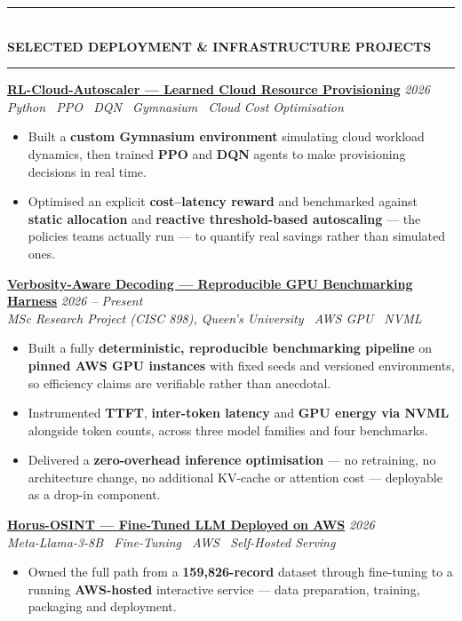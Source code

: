 \documentclass[10pt, a4paper]{article}
\newcommand{\cvsection}[1]{%
  \vspace{3pt}%
  {\color{navy}\rule{\linewidth}{1.1pt}}\\[0.5pt]%
  {\color{navy}\bfseries\fontsize{9.5}{11}\selectfont\uppercase{#1}}\\[-4pt]%
  {\color{teal}\rule{\linewidth}{0.6pt}}%
  \vspace{2pt}%
}
\newcommand{\cvproject}[3]{%
  \vspace{2.5pt}%
  {\bfseries\color{navy}#1} \hfill {\color{midgray}\textit{#3}}\\[-1.5pt]%
  {\color{teal}\textit{#2}}%
}
\newenvironment{cvitems}{%
  \begin{itemize}[leftmargin=11pt, itemsep=0.5pt, parsep=0pt, topsep=1pt,
                  label={\textcolor{teal}{$\bullet$}}]
}{%
  \end{itemize}%
}
\begin{document}
\cvsection{Selected Deployment \& Infrastructure Projects}

\cvproject{\href{https://github.com/MahmoudAlyosify/RL-Cloud-Autoscaler}{RL-Cloud-Autoscaler --- Learned Cloud Resource Provisioning}}
          {Python \textperiodcentered\ PPO \textperiodcentered\ DQN \textperiodcentered\ Gymnasium \textperiodcentered\ Cloud Cost Optimisation}
          {2026}
\begin{cvitems}
  \item Built a \textbf{custom Gymnasium environment} simulating cloud workload dynamics, then trained \textbf{PPO} and \textbf{DQN} agents to make provisioning decisions in real time.
  \item Optimised an explicit \textbf{cost--latency reward} and benchmarked against \textbf{static allocation} and \textbf{reactive threshold-based autoscaling} --- the policies teams actually run --- to quantify real savings rather than simulated ones.
\end{cvitems}

\cvproject{\href{https://github.com/MahmoudAlyosify/minimal-lm}{Verbosity-Aware Decoding --- Reproducible GPU Benchmarking Harness}}
          {MSc Research Project (CISC 898), Queen's University \textperiodcentered\ AWS GPU \textperiodcentered\ NVML}
          {2026 -- Present}
\begin{cvitems}
  \item Built a fully \textbf{deterministic, reproducible benchmarking pipeline} on \textbf{pinned AWS GPU instances} with fixed seeds and versioned environments, so efficiency claims are verifiable rather than anecdotal.
  \item Instrumented \textbf{TTFT}, \textbf{inter-token latency} and \textbf{GPU energy via NVML} alongside token counts, across three model families and four benchmarks.
  \item Delivered a \textbf{zero-overhead inference optimisation} --- no retraining, no architecture change, no additional KV-cache or attention cost --- deployable as a drop-in component.
\end{cvitems}

\cvproject{\href{https://github.com/MahmoudAlyosify/Horus-OSINT}{Horus-OSINT --- Fine-Tuned LLM Deployed on AWS}}
          {Meta-Llama-3-8B \textperiodcentered\ Fine-Tuning \textperiodcentered\ AWS \textperiodcentered\ Self-Hosted Serving}
          {2026}
\begin{cvitems}
  \item Owned the full path from a \textbf{159,826-record} dataset through fine-tuning to a running \textbf{AWS-hosted} interactive service --- data preparation, training, packaging and deployment.
\end{cvitems}
\end{document}
